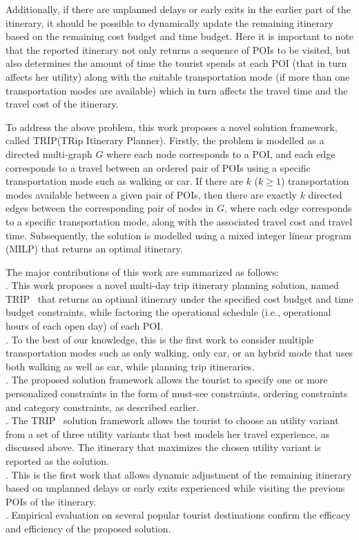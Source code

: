\documentclass[sigconf,authordraft]{acmart}
\newcommand{\trip}{TRIP}
\begin{document}
Additionally, if there are unplanned delays or early exits in the earlier part of the itinerary, it should be possible to dynamically update the remaining itinerary based on the remaining cost budget and time budget. Here it is important to note that the reported itinerary not only returns a sequence of POIs to be visited, but also determines the amount of time the tourist spends at each POI (that in turn affects her utility) along with the suitable transportation mode (if more than one transportation modes are available) which in turn affects the travel time and the travel cost of the itinerary.

To address the above problem, this work proposes a novel solution framework,  called \trip (TRip Itinerary Planner).  Firstly, the problem is modelled as a directed multi-graph $G$ where each node corresponds to a POI, and each edge corresponds to a travel between an ordered pair of POIs using a specific transportation mode such as walking or car. If there are $k$ ($k \ge 1$) transportation modes available between a given pair of POIs, then there are exactly $k$ directed edges between the corresponding pair of nodes in $G$, where each edge corresponds to a specific transportation mode, along with the associated travel cost and travel time. Subsequently, the solution is modelled using a mixed integer linear program (MILP) that returns an optimal itinerary.

The major contributions of this work are summarized as follows:\\


. This work proposes a novel multi-day trip itinerary planning solution, named \trip~ that returns an optimal itinerary 
under the specified cost budget and time budget constraints, while factoring the operational schedule (i.e., operational hours of each open day) of each POI.\\
. To the best of our knowledge, this is the first work to consider multiple transportation modes such as only walking, only car, or an hybrid mode that uses both walking as well as car, while planning trip itineraries.\\
. The proposed solution framework allows the tourist to specify one or more personalized constraints in the form of must-see constraints, ordering constraints and category constraints, as described earlier.\\
. The \trip~ solution framework allows the tourist to choose an utility variant from a set of three utility variants that best models her travel experience, as discussed above. The itinerary that maximizes the chosen utility variant is reported as the solution.\\
. This is the first work that allows dynamic adjustment of the remaining itinerary based on unplanned delays or early exits experienced while visiting the previous POIs of the itinerary.\\
. Empirical evaluation on several popular tourist destinations confirm the efficacy and efficiency of the proposed solution. 
\end{document}
